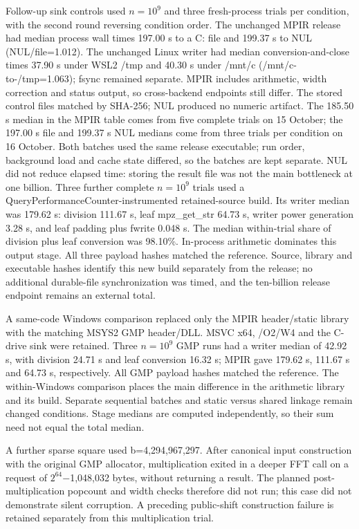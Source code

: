 \documentclass[11pt,a4paper]{article}
\begin{document}
Follow-up sink controls used $n=10^{9}$ and three fresh-process trials per condition, with the second round reversing condition order. The unchanged MPIR release had median process wall times 197.00 s to a C: file and 199.37 s to NUL (NUL/file=1.012). The unchanged Linux writer had median conversion-and-close times 37.90 s under WSL2 /tmp and 40.30 s under /mnt/c (/mnt/c-to-/tmp=1.063); fsync remained separate. MPIR includes arithmetic, width correction and status output, so cross-backend endpoints still differ. The stored control files matched by SHA-256; NUL produced no numeric artifact. The 185.50 s median in the MPIR table comes from five complete trials on 15 October; the 197.00 s file and 199.37 s NUL medians come from three trials per condition on 16 October. Both batches used the same release executable; run order, background load and cache state differed, so the batches are kept separate. NUL did not reduce elapsed time: storing the result file was not the main bottleneck at one billion. Three further complete $n=10^{9}$ trials used a QueryPerformanceCounter-instrumented retained-source build. Its writer median was 179.62 s: division 111.67 s, leaf mpz\_\allowbreak{}get\_\allowbreak{}str 64.73 s, writer power generation 3.28 s, and leaf padding plus fwrite 0.048 s. The median within-trial share of division plus leaf conversion was 98.10\%. In-process arithmetic dominates this output stage. All three payload hashes matched the reference. Source, library and executable hashes identify this new build separately from the release; no additional durable-file synchronization was timed, and the ten-billion release endpoint remains an external total.

A same-code Windows comparison replaced only the MPIR header/static library with the matching MSYS2 GMP header/DLL. MSVC x64, /O2/W4 and the C-drive sink were retained. Three $n=10^{9}$ GMP runs had a writer median of 42.92 s, with division 24.71 s and leaf conversion 16.32 s; MPIR gave 179.62 s, 111.67 s and 64.73 s, respectively. All GMP payload hashes matched the reference. The within-Windows comparison places the main difference in the arithmetic library and its build. Separate sequential batches and static versus shared linkage remain changed conditions. Stage medians are computed independently, so their sum need not equal the total median.

A further sparse square used b=4,294,967,297. After canonical input construction with the original GMP allocator, multiplication exited in a deeper FFT call on a request of $2^{64}$\ensuremath{-}1,048,032 bytes, without returning a result. The planned post-multiplication popcount and width checks therefore did not run; this case did not demonstrate silent corruption. A preceding public-shift construction failure is retained separately from this multiplication trial.
\end{document}
